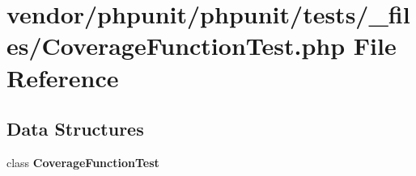 \section{vendor/phpunit/phpunit/tests/\+\_\+files/\+Coverage\+Function\+Test.php File Reference}
\label{phpunit_2tests_2__files_2_coverage_function_test_8php}
\subsection*{Data Structures}
\begin{DoxyCompactItemize}
\item 
class {\bf Coverage\+Function\+Test}
\end{DoxyCompactItemize}
